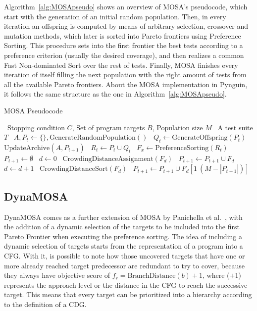 \documentclass[%
  chapterprefix=false,%
  open=right,%
  twoside=true,%
  paper=a4,%
  logofile={Figures/logo.png},%
  thesistype=master,%
  UKenglish,%
]{se2thesis}
\begin{document}
Algorithm~\ref{alg:MOSApseudo} shows an overview of MOSA's pseudocode, which start with the generation of an initial random population.
Then, in every iteration an offspring is computed by means of arbitrary selection, crossover and mutation methods, which later is sorted into Pareto frontiers using Preference Sorting.
This procedure sets into the first frontier the best tests according to a preference criterion (usually the desired coverage), and then realizes a common Fast Non-dominated Sort over the rest of tests.
Finally, MOSA finishes every iteration of itself filling the next population with the right amount of tests from all the available Pareto frontiers.
About the MOSA implementation in Pynguin, it follows the same structure as the one in Algorithm~\ref{alg:MOSApseudo}.

\algrenewcommand{}
\algrenewcommand{}


\begin{algorithm}[h!]
  \centering
  \caption{MOSA Pseudocode}\label{alg:MOSApseudo}
  \begin{algorithmic}[1]
    \Require~Stopping condition \(C\), Set of program targets \(B\), Population size \(M\)
    \Ensure~A test suite \(T\)
    \State~\(A, P_t \gets \{\}, \text{GenerateRandomPopulation}()\) 
      \State~\(Q_t \gets \text{GenerateOffspring}(P_t)\)
      \State~\(\text{UpdateArchive}(A, P_{t+1})\)
      \State~\(R_t \gets P_t \cup Q_t\)
      \State~\(F_x \gets \text{PreferenceSorting}(R_t)\)
      \State~\(P_{t+1} \gets \emptyset \)
      \State~\(d \gets 0\)
        \State~\(\text{CrowdingDistanceAssignment}(F_d)\)
        \State~\(P_{t+1} \gets P_{t+1} \cup F_d\)
        \State~\(d \gets d + 1\)
      \EndWhile\@
      \State~\(\text{CrowdingDistanceSort}(F_d)\)
      \State~\(P_{t+1} \gets P_{t+1} \cup F_d[1\: (M - |P_{t+1}|)]\)
    \EndWhile\@
  \end{algorithmic}
\end{algorithm}

\newpage

\subsection{DynaMOSA}\label{sec:dynamosa}

DynaMOSA comes as a further extension of MOSA by Panichella et al.~\cite{DBLP:journals/tse/PanichellaKT18}, with the addition of a dynamic selection of the targets to be included into the first Pareto Frontier when executing the preference sorting.
The idea of including a dynamic selection of targets starts from the representation of a program into a CFG.\@
With it, is possible to note how those uncovered targets that have one or more already reached target predecessor are redundant to try to cover, because they always have objective score of \(f_r = \text{BranchDistance}(b) + 1\), where (\(+1\)) represents the approach level or the distance in the CFG to reach the successive target.
This means that every target can be prioritized into a hierarchy according to the definition of a CDG.\@
\end{document}

